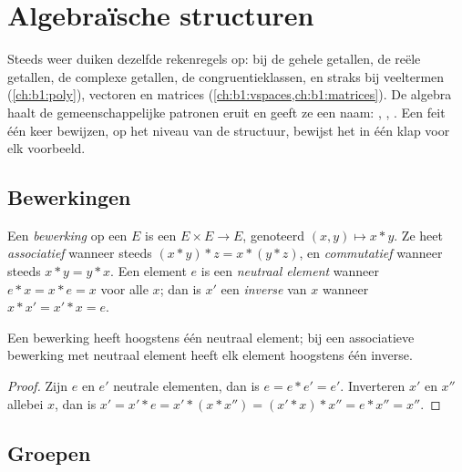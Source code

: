 \chapter{Algebraïsche structuren}\label{ch:b1:structures}

Steeds weer duiken dezelfde rekenregels op: bij de gehele getallen, de
reële getallen, de complexe getallen, de congruentieklassen, en straks bij
veeltermen (\cref{ch:b1:poly}), vectoren en matrices
(\cref{ch:b1:vspaces,ch:b1:matrices}). De algebra haalt de gemeenschappelijke
patronen eruit en geeft ze een naam: \emph{}, \emph{},
\emph{}. Een feit één keer bewijzen, op het niveau van de
structuur, bewijst het in één klap voor elk voorbeeld.

\section{Bewerkingen}

\begin{definition}\label{def:b1:structures:law}
Een \emph{bewerking} op een  $E$ is een
 $E \times E \to E$, genoteerd $(x, y) \mapsto x * y$. Ze heet
\emph{associatief} wanneer steeds $(x*y)*z = x*(y*z)$, en
\emph{commutatief} wanneer steeds $x * y = y * x$. Een element $e$ is een
\emph{neutraal element} wanneer $e * x = x * e = x$ voor alle $x$; dan is
$x'$ een \emph{inverse} van $x$ wanneer $x * x' = x' * x = e$.
\end{definition}

\begin{proposition}[Uniciteit]\label{prop:b1:structures:unique}
Een bewerking heeft hoogstens één neutraal element; bij een associatieve
bewerking met neutraal element heeft elk element hoogstens één inverse.
\end{proposition}

\begin{proof}
Zijn $e$ en $e'$ neutrale elementen, dan is $e = e * e' = e'$. Inverteren
$x'$ en $x''$ allebei $x$, dan is $x' = x' * e = x' * (x * x'') = (x' *
x) * x'' = e * x'' = x''$.
\end{proof}

\section{Groepen}

